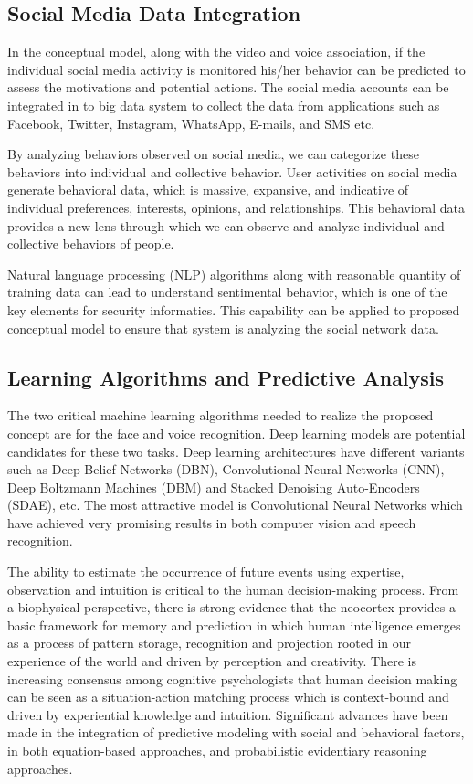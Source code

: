 \documentclass[sigconf]{acmart}
\begin{document}
\subsection{Social Media Data Integration}
In the conceptual model, along with the video and voice association, if the individual social media activity is monitored his/her behavior can be predicted to assess the motivations and potential actions. The social media accounts can be integrated in to big data system to collect the data from applications such as Facebook, Twitter, Instagram, WhatsApp, E-mails, and SMS etc.

By analyzing behaviors observed on social media, we can categorize these behaviors into individual and collective behavior. User activities on social media generate behavioral data, which is massive, expansive, and indicative of individual preferences, interests, opinions, and relationships. This behavioral data provides a new lens through which we can observe and analyze individual and collective behaviors of people.

Natural language processing (NLP) algorithms along with reasonable quantity of training data can lead to understand sentimental behavior, which is one of the key elements for security informatics. This capability can be applied to proposed conceptual model to ensure that system is analyzing the social network data.

\subsection{Learning Algorithms and Predictive Analysis}
The two critical machine learning algorithms needed to realize the proposed concept are for the face and voice recognition. Deep learning models are potential candidates for these two tasks. Deep learning architectures have different variants such as Deep Belief Networks (DBN)\cite{Hinton2009}, Convolutional Neural Networks (CNN)\cite{NIPS2012-4824}, Deep Boltzmann Machines (DBM)\cite{pmlr-v9-salakhutdinov10a} and Stacked Denoising Auto-Encoders (SDAE)\cite{Vincent2010}, etc. The most attractive model is Convolutional Neural Networks which have achieved very promising results in both computer vision and speech recognition.

 The ability to estimate the occurrence of future events using expertise, observation and intuition is critical to the human decision-making process. From a biophysical perspective, there is strong evidence that the neocortex provides a basic framework for memory and prediction in which human intelligence emerges as a process of pattern storage, recognition and projection rooted in our experience of the world and driven by perception and creativity. There is increasing consensus among cognitive psychologists that human decision making can be seen as a situation-action matching process which is context-bound and driven by experiential knowledge and intuition. Significant advances have been made in the integration of predictive modeling with social and behavioral factors, in both equation-based approaches, and probabilistic evidentiary reasoning approaches\cite{Sanfilippo2012}. 
\end{document}
